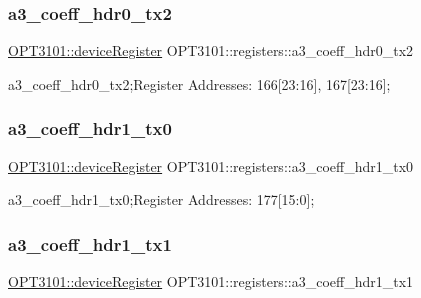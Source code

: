 \subsubsection{\texorpdfstring{a3\+\_\+coeff\+\_\+hdr0\+\_\+tx2}{a3\_coeff\_hdr0\_tx2}}
{\footnotesize\ttfamily \mbox{\hyperlink{class_o_p_t3101_1_1device_register}{O\+P\+T3101\+::device\+Register}} O\+P\+T3101\+::registers\+::a3\+\_\+coeff\+\_\+hdr0\+\_\+tx2}



a3\+\_\+coeff\+\_\+hdr0\+\_\+tx2;Register Addresses\+: 166\mbox{[}23\+:16\mbox{]}, 167\mbox{[}23\+:16\mbox{]}; 

\mbox{\label{class_o_p_t3101_1_1registers_a4d71ddf517bc042fc30fd79e1bbdfb4b}} 
\subsubsection{\texorpdfstring{a3\+\_\+coeff\+\_\+hdr1\+\_\+tx0}{a3\_coeff\_hdr1\_tx0}}
{\footnotesize\ttfamily \mbox{\hyperlink{class_o_p_t3101_1_1device_register}{O\+P\+T3101\+::device\+Register}} O\+P\+T3101\+::registers\+::a3\+\_\+coeff\+\_\+hdr1\+\_\+tx0}



a3\+\_\+coeff\+\_\+hdr1\+\_\+tx0;Register Addresses\+: 177\mbox{[}15\+:0\mbox{]}; 

\mbox{\label{class_o_p_t3101_1_1registers_a41edd1d9914ee0b1d44f31e8d11839b0}} 
\subsubsection{\texorpdfstring{a3\+\_\+coeff\+\_\+hdr1\+\_\+tx1}{a3\_coeff\_hdr1\_tx1}}
{\footnotesize\ttfamily \mbox{\hyperlink{class_o_p_t3101_1_1device_register}{O\+P\+T3101\+::device\+Register}} O\+P\+T3101\+::registers\+::a3\+\_\+coeff\+\_\+hdr1\+\_\+tx1}



